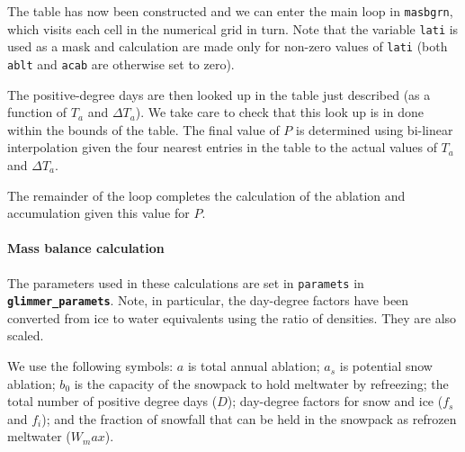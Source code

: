 The table has now been constructed and we can enter the main loop
in \texttt{masbgrn}, which visits each cell in the numerical grid
in turn. Note that the variable \texttt{lati} is used as a mask
and calculation are made only for non-zero values of \texttt{lati}
(both \texttt{ablt} and \texttt{acab} are otherwise set to zero).

The positive-degree days are then looked up in the table just
described (as a function of $T_a$ and $\Delta T_a$). We take care
to check that this look up is in done within the bounds of the
table.  The final value of $P$ is determined using bi-linear
interpolation given the four nearest entries in the table to the
actual values of $T_a$ and $\Delta T_a$.

The remainder of the loop completes the calculation of the
ablation and accumulation given this value for $P$.

\paragraph{Mass balance calculation} The parameters used in these
calculations are set in \texttt{paramets} in
\textbf{\texttt{glimmer\_paramets}}. Note, in particular, the
day-degree factors have been converted from ice to water
equivalents using the ratio of densities.  They are also scaled.

We use the following symbols: $a$ is total annual ablation; $a_s$
is potential snow ablation; $b_0$ is the capacity of the snowpack
to hold meltwater by refreezing; the total number of positive
degree days ($D$); day-degree factors for snow and ice ($f_s$ and
$f_i$); and the fraction of snowfall that can be held in the
snowpack as refrozen meltwater ($W_max$).

